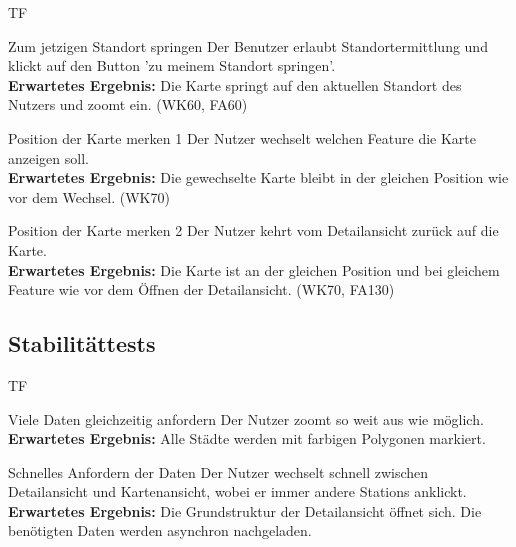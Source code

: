 \begin{Kriterien}{TF}
	\item[Zum jetzigen Standort springen] Der Benutzer erlaubt Standortermittlung und klickt auf den Button  'zu meinem Standort springen'. \\ \textbf{Erwartetes Ergebnis:} Die Karte springt auf den aktuellen Standort des Nutzers und zoomt ein. (WK60, FA60)
	
	\item[Position der Karte merken 1] Der Nutzer wechselt welchen Feature die Karte anzeigen soll. \\ 
	\textbf{Erwartetes Ergebnis:} Die gewechselte Karte bleibt in der gleichen Position wie vor dem Wechsel. (WK70)
	
	\item[Position der Karte merken 2] Der Nutzer kehrt vom Detailansicht zurück auf die Karte. \\ 
	\textbf{Erwartetes Ergebnis:} Die Karte ist an der gleichen Position und bei gleichem Feature wie vor dem Öffnen der \gls{Detailansicht}. (WK70, FA130)
	
\end{Kriterien}
\subsection{Stabilitättests}
\begin{Kriterien}{TF}

	\item[Viele Daten gleichzeitig anfordern] Der Nutzer zoomt so weit aus wie möglich.\\ \textbf{Erwartetes Ergebnis:} Alle Städte werden mit farbigen Polygonen markiert.

	\item[Schnelles Anfordern der Daten] Der Nutzer wechselt schnell zwischen Detailansicht und Kartenansicht, wobei er immer andere \glspl{Station} anklickt. \\ \textbf{Erwartetes Ergebnis:} Die Grundstruktur der Detailansicht öffnet sich. 
	Die benötigten Daten werden asynchron nachgeladen.

\end{Kriterien}

